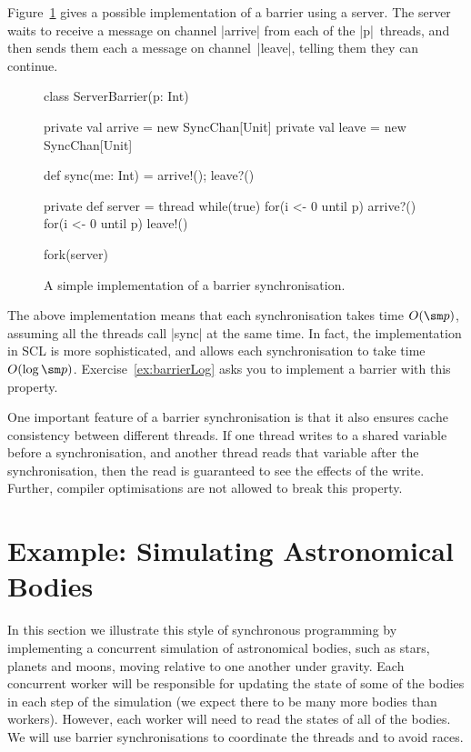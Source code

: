 

Figure~\ref{fig:serverBarrier} gives a possible implementation of a barrier
using a server.  The server waits to receive a message on channel |arrive|
from each of the |p|~threads, and then sends them each a message on
channel~|leave|, telling them they can continue.

\begin{figure}[thb]
\begin{scala}
class ServerBarrier(p: Int){
  private val arrive = new SyncChan[Unit]
  private val leave = new SyncChan[Unit]

  def sync(me: Int) = { arrive!(); leave?() }

  private def server = thread{
    while(true){
      for(i <- 0 until p) arrive?()
      for(i <- 0 until p) leave!()
    }
  }

  fork(server)
}
\end{scala}
\caption{A simple implementation of a barrier synchronisation.}
\label{fig:serverBarrier}
\end{figure}

The above implementation means that each synchronisation takes time $O(\sm p)$,
assuming all the threads call |sync| at the same time.  In fact, the
implementation in SCL is more sophisticated, and allows each synchronisation
to take time $O(\log \sm p)$.  Exercise~\ref{ex:barrierLog} asks you to
implement a barrier with this property.

One important feature of a barrier synchronisation is that it also ensures
cache consistency between different threads.  If one
thread writes to a shared variable before a synchronisation, and another
thread reads that variable after the synchronisation, then the read is
guaranteed to see the effects of the write.  Further, compiler optimisations
are not allowed to break this property.


\section{Example: Simulating Astronomical Bodies}
\label{sec:astronomical-bodies}

In this section we illustrate this style of synchronous programming by
implementing a concurrent simulation of astronomical bodies, such as stars,
planets and moons, moving relative to one another under gravity.  Each
concurrent worker will be responsible for updating the state of some of the
bodies in each step of the simulation (we expect there to be many more bodies
than workers).  However, each worker will need to read the states of all of
the bodies.  We will use barrier synchronisations to coordinate the threads
and to avoid races.

